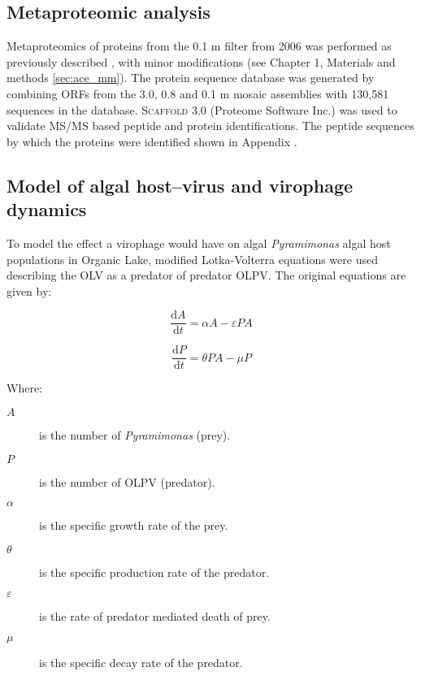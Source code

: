 \subsection{Metaproteomic analysis}
Metaproteomics of proteins from the 0.1 \textmu{}m filter from 2006 was performed as previously described \cite{Ng2010a, Lauro2011}, with minor modifications (see Chapter 1, Materials and methods \ref{sec:ace_mm}). 
The protein sequence database was generated by combining ORFs from the 3.0, 0.8 and 0.1 \textmu{}m mosaic assemblies with 130,581 sequences in the database. 
\textsc{Scaffold} 3.0 (Proteome Software Inc.) was used to validate MS/MS based peptide and protein identifications. 
The peptide sequences by which the proteins were identified shown in Appendix .

\subsection[Model of algal host--virus and virophage dynamics]{Model of algal host--virus and virophage dynamics}
To model the effect a virophage would have on algal \emph{Pyramimonas} algal host populations in Organic Lake, modified Lotka-Volterra equations were used describing the \ac{OLV} as a predator of predator \ac{OLPV}. 
The original equations are given by:

\begin{equation}
\frac{\mathrm{d}A}{\mathrm{d}t}=\alpha A - \varepsilon PA
\label{eqn:lokprey}
\end{equation}

\begin{equation}
\frac{\mathrm{d}P}{\mathrm{d}t}= \theta PA - \mu P
\label{eqn:lokpred}
\end{equation}

Where:
\begin{description}
\item[$A$] is the number of \emph{Pyramimonas} (prey).
\item[$P$] is the number of \ac{OLPV} (predator).
\item[$\alpha$] is the specific growth rate of the prey.
\item[$\theta$] is the specific production rate of the predator.
\item[$\varepsilon$] is the rate of predator mediated death of prey.
\item[$\mu$] is the specific decay rate of the predator.
\end{description}

